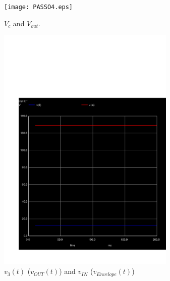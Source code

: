 \newpage

\begin{figure}[h] \centering
	\texttt{[image: PASSO4.eps]}
	\caption{$V_c$ and $V_{out}$.}
\end{figure}
  	
\begin{figure}[h] \centering
	\vspace{-2cm}
	\includegraphics[height=12cm]{../sim/trans4.pdf}
	\caption{$v_3(t)$ ($v_{OUT}(t)$) and $v_{IN}$ ($v_{Envelope}(t)$)}
	\vspace{-3cm}
\end{figure}
